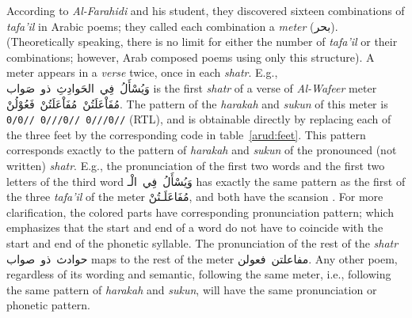 According to \textit{Al-Farahidi} and his student, they discovered sixteen combinations of
\textit{tafa'il} in Arabic poems; they called each combination a \textit{meter}
(\textarabic{بحر}). (Theoretically speaking, there is no limit for either the number of
\textit{tafa'il} or their combinations; however, Arab composed poems using only this structure). A
meter appears in a \textit{verse} twice, once in each \textit{shatr}. E.g., \mbox{\textarabic{وَيُسْأَلُ
    فِي الحَوادِثِ ذو صَواب}} is the first \textit{shatr} of a verse of \textit{Al-Wafeer} meter
\mbox{\textarabic{مُفَاْعَلَتُنْ مُفَاْعَلَتُنْ فَعُوْلُنْ}}. The pattern of the \textit{harakah} and \textit{sukun} of
this meter is \mbox{\texttt{0/0// 0///0// 0///0//}} (RTL), and is obtainable directly by replacing
each of the three feet by the corresponding code in table~\ref{arud:feet}. This pattern corresponds
exactly to the pattern of \textit{harakah} and \textit{sukun} of the pronounced (not written)
\textit{shatr}. E.g., the pronunciation of the first two words and the first two letters of the
third word \mbox{\textarabic{{\color{OliveGreen}وَيُسْأَلُ} {\color{fgred}فِي الْـ}}} has exactly the same
pattern as the first of the three \textit{{tafa'il}} of the meter
\mbox{\textarabic{{\color{OliveGreen}مُفَاعَلَـ}{\color{fgred}تُنْ}}}, and both have the scansion
\texttt{\color{fgred}{0/}\color{OliveGreen}{//0//}}. For more clarification, the colored parts have
corresponding pronunciation pattern; which emphasizes that the start and end of a word do not have
to coincide with the start and end of the phonetic syllable. The pronunciation of the rest of the
\textit{shatr} \mbox{\textarabic{حوادث ذو صواب}} maps to the rest of the meter
\mbox{\textarabic{مفاعلتن فعولن}}. Any other poem, regardless of its wording and semantic, following
the same meter, i.e., following the same pattern of \textit{harakah} and \textit{sukun}, will have
the same pronunciation or phonetic pattern.
